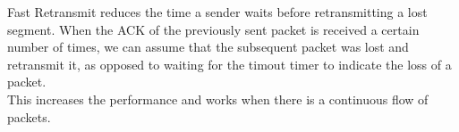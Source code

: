 Fast Retransmit reduces the time a sender waits before retransmitting a lost segment. When the ACK of the previously sent packet is received a certain number of times, we can assume that the subsequent packet was lost and retransmit it, as opposed to waiting for the timout timer to indicate the loss of a packet.\\
This increases the performance and works when there is a continuous flow of packets.